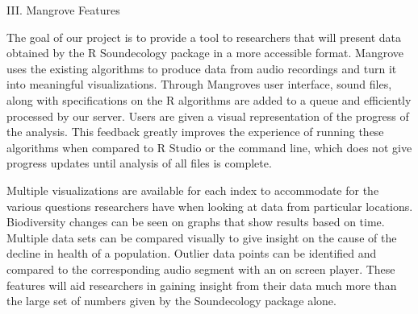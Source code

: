 \begin{center}
III. Mangrove Features
\end{center}
\begin{flushleft}
\setlength{\parindent}{0.125in}
The goal of our project is to provide a tool to researchers that will present data obtained by the R Soundecology package in a more accessible format. Mangrove uses the existing  algorithms to produce data from audio recordings and turn it into meaningful visualizations. Through Mangrove\textquotesingle s user interface, sound files, along with specifications on the R algorithms are added to a queue and efficiently processed by our server. Users are given a visual representation of the progress of the analysis. This feedback greatly improves the experience of running these algorithms when compared to R Studio or the command line, which does not give progress updates until analysis of all files is complete.\par
Multiple visualizations are available for each index to accommodate for the various questions  researchers have when looking at data from particular locations. Biodiversity changes can be seen on graphs that show results based on time. Multiple data sets can be compared visually to give insight on the cause of the decline in health of a population. Outlier data points can be identified and compared to the corresponding audio segment with an on screen player. These features will aid researchers in gaining insight from their data much more than the large set of numbers given by the Soundecology package alone.\par
\pagebreak[2]
\end{flushleft}